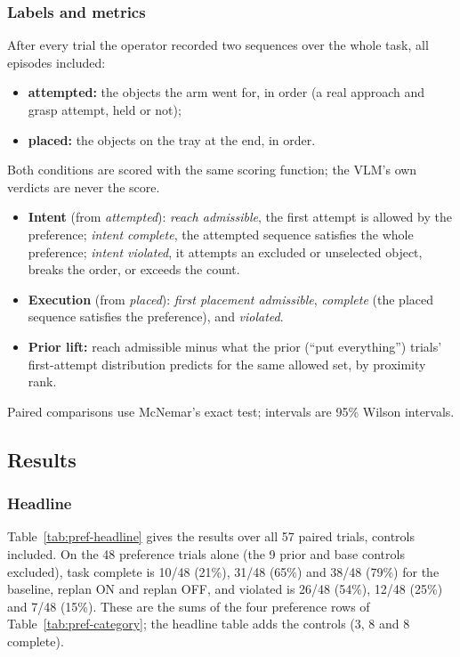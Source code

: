 \subsubsection{Labels and metrics}
After every trial the operator recorded two sequences over the whole task, all episodes
included:
\begin{itemize}
  \item \textbf{attempted:} the objects the arm went for, in order (a real approach and
    grasp attempt, held or not);
  \item \textbf{placed:} the objects on the tray at the end, in order.
\end{itemize}
Both conditions are scored with the same scoring function; the VLM's own verdicts are
never the score.
\begin{itemize}
  \item \textbf{Intent} (from \emph{attempted}): \emph{reach admissible}, the first attempt
    is allowed by the preference; \emph{intent complete}, the attempted sequence satisfies
    the whole preference; \emph{intent violated}, it attempts an excluded or unselected
    object, breaks the order, or exceeds the count.
  \item \textbf{Execution} (from \emph{placed}): \emph{first placement admissible},
    \emph{complete} (the placed sequence satisfies the preference), and \emph{violated}.
  \item \textbf{Prior lift:} reach admissible minus what the prior (``put everything'')
    trials' first-attempt distribution predicts for the same allowed set, by proximity
    rank.
\end{itemize}
Paired comparisons use McNemar's exact test; intervals are 95\% Wilson intervals.

\subsection{Results}

\subsubsection{Headline}
Table~\ref{tab:pref-headline} gives the results over all 57 paired trials, controls
included. On the 48 preference trials alone (the 9 prior and base controls excluded), task
complete is 10/48 (21\%), 31/48 (65\%) and 38/48 (79\%) for the baseline, replan ON and
replan OFF, and violated is 26/48 (54\%), 12/48 (25\%) and 7/48 (15\%). These are the
sums of the four preference rows of Table~\ref{tab:pref-category}; the headline table adds
the controls (3, 8 and 8 complete).

